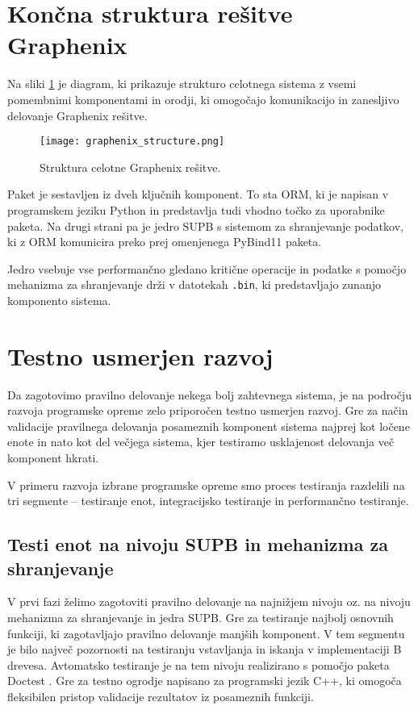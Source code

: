 \documentclass[a4paper,12pt,openright]{book}
\begin{document}
    \newpage
    \section{Končna struktura rešitve Graphenix}

    Na sliki \ref{graphenix_structure} je diagram, ki prikazuje strukturo celotnega sistema z vsemi pomembnimi komponentami in orodji, ki omogočajo komunikacijo in zanesljivo delovanje Graphenix rešitve.
    
    \begin{figure}[H]
            \centerline{\texttt{[image: graphenix\_structure.png]}}
            \caption{Struktura celotne Graphenix rešitve.}
        \label{graphenix_structure}
    \end{figure}

    \noindent
    Paket je sestavljen iz dveh ključnih komponent. To sta ORM, ki je napisan v programskem jeziku Python in predstavlja tudi vhodno točko za uporabnike paketa. Na drugi strani pa je jedro SUPB s sistemom za shranjevanje podatkov, ki z ORM komunicira preko prej omenjenega PyBind11 \cite{PYBIND11_GITHUB} paketa.

    Jedro vsebuje vse performančno gledano kritične operacije in podatke s pomočjo mehanizma za shranjevanje drži v datotekah {\tt .bin}, ki predstavljajo zunanjo komponento sistema.
    
    \section{Testno usmerjen razvoj}

    Da zagotovimo pravilno delovanje nekega bolj zahtevnega sistema, je na področju razvoja programske opreme zelo priporočen testno usmerjen razvoj. Gre za način validacije pravilnega delovanja posameznih komponent sistema najprej kot ločene enote in nato kot del večjega sistema, kjer testiramo usklajenost delovanja več komponent hkrati.
    
    V primeru razvoja izbrane programske opreme smo proces testiranja razdelili na tri segmente – testiranje enot, integracijsko testiranje in performančno testiranje.
   
   \subsection{Testi enot na nivoju SUPB in mehanizma za shranjevanje}

    V prvi fazi želimo zagotoviti pravilno delovanje na najnižjem nivoju oz. na nivoju mehanizma za shranjevanje in jedra SUPB. Gre za testiranje najbolj osnovnih funkciji, ki zagotavljajo pravilno delovanje manjših komponent. V tem segmentu je bilo največ pozornosti na testiranju vstavljanja in iskanja v implementaciji B drevesa. Avtomatsko testiranje je na tem nivoju realizirano s pomočjo paketa Doctest \cite{DOCTEST_GITHUB}. Gre za testno ogrodje napisano za programski jezik C++, ki omogoča fleksibilen pristop validacije rezultatov iz posameznih funkciji.
   
\end{document}
